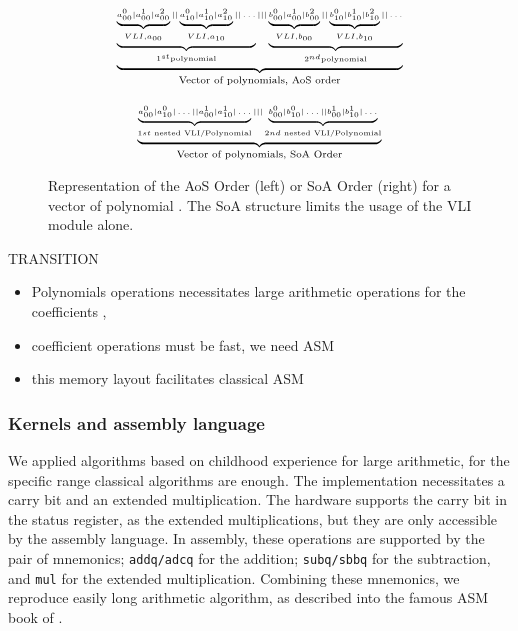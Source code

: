 \documentclass[oribibl]{llncs2e/llncs}
\begin{document}
\begin{figure}
    \begin{minipage}{0.50\linewidth}
        \begin{eqnarray}
        \tiny{
                 \underbrace{
                 \underbrace{ \underbrace{a^0_{00} | a^1_{00} | a^2_{00}}_{VLI, a_{00} } || \underbrace{a^0_{10} | a^1_{10} | a^2_{10}}_{VLI, a_{10}} ||   \dots  }_{1^{st} \textrm{polynomial}} 
                  |||    \underbrace{ \underbrace{b^0_{00} | a^1_{00} | b^2_{00}}_{VLI, b_{00} } || \underbrace{b^0_{10} | b^1_{10} | b^2_{10}}_{VLI, b_{10}} ||   \dots  }_{2^{nd} \textrm{polynomial} } }_{\textrm{Vector of polynomials, AoS order}} \nonumber
            }
        \end{eqnarray}
    \end{minipage}
\begin{minipage}{0.50\linewidth}
    \begin{eqnarray}
    \tiny{
        \underbrace{
        \underbrace{a^0_{00} | a^0_{10} | \dots || a^1_{00} | a^1_{10} | \dots  }_{1st  \textrm{ nested VLI/Polynomial} } |||  \underbrace{b^0_{00} | b^0_{10} | \dots || b^1_{00} | b^1_{10} | \dots  }_{2nd  \textrm{ nested VLI/Polynomial} }
        }_{\textrm{Vector of polynomials, SoA Order}} \nonumber }
        \end{eqnarray}
\end{minipage}
\caption{Representation of the AoS Order (left) or SoA Order (right) for a vector of polynomial \label{AOSSOA}.  The SoA structure limits the usage of the VLI module alone.}
\end{figure}

TRANSITION
\begin{itemize}
\item Polynomials operations necessitates large arithmetic operations for the coefficients ,
\item  coefficient operations must be fast, we need ASM 
\item this memory layout facilitates classical ASM 
\end{itemize}


\subsubsection{Kernels and assembly  language}





We applied algorithms based on childhood  experience for large arithmetic, for the specific range classical algorithms are enough.
The implementation necessitates a carry bit and an extended multiplication. The hardware supports
the carry bit in the status register, as the extended multiplications, but they are only accessible by the assembly language.
In assembly, these operations  are supported by the pair of mnemonics; \texttt{addq/adcq} for the addition; \texttt{subq/sbbq} for the subtraction, and \texttt{mul} for the extended multiplication.   
Combining these mnemonics, we reproduce easily long arithmetic algorithm, as described into the famous  ASM book of \cite{Hyde:2003:AAL:861534}. 
\end{document}
